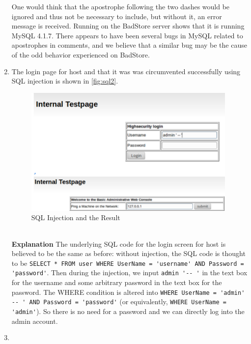 \begin{enumerate}
One would think that the apostrophe following the two dashes would be ignored and thus not be necessary to include, but without it, an error message is received. Running  on the BadStore server shows that it is running MySQL 4.1.7. There appears to have been several bugs in MySQL related to apostrophes in comments\cite{quoteComment1}\cite{quoteComment2}, and we believe that a similar bug may be the cause of the odd behavior experienced on BadStore.
\item {}

The login page for host  and that it was was circumvented successfully using SQL injection is shown in \autoref{fig:sql2}.
\begin{figure}[h!]
	\caption{SQL Injection and the Result}
        \label{fig:sql2}
	\centering \includegraphics[height=2.5in]{sqli2}
\end{figure}
\\
  \textbf{Explanation} The underlying SQL code for the login screen for host  is believed to be the same as before: without injection, the SQL code is thought to be \lstinline{SELECT * FROM user WHERE UserName = 'username' AND Password = 'password'}. Then during the injection, we input \lstinline{admin '-- '} in the text box for the username and some arbitrary password in the text box for the password. The WHERE condition is altered into \lstinline{WHERE UserName = 'admin' -- ' AND Password = 'password'} (or equivalently, \lstinline{WHERE UserName = 'admin'}). So there is no need for a password and we can directly log into the admin account.
\item {}


\end{enumerate}
